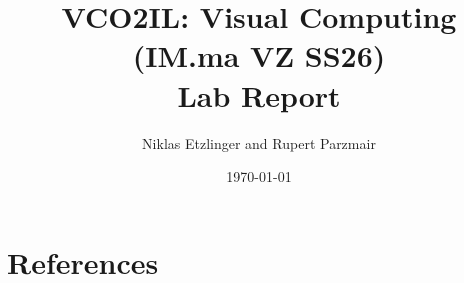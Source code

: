 \documentclass[language=english,titlepage=false,smartquotes=true]{hgbreport}
\begin{document}

\author{Niklas Etzlinger and Rupert Parzmair}                      %
\title{VCO2IL: Visual Computing (IM.ma VZ SS26)\\ %
				Lab Report }
\date{\today}

\maketitle











\section*{References}

\printbibliography[heading=noheader]

\end{document}

